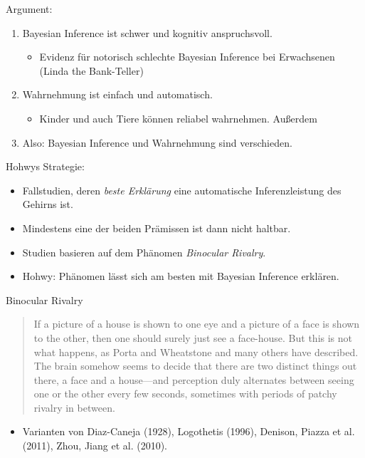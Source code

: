 \documentclass[11pt, handout]{beamer}
\begin{document}
\begin{frame}
  Argument:

  \begin{enumerate}[<+->]
  \item Bayesian Inference ist schwer und kognitiv anspruchsvoll.
    \begin{itemize}[<+->]
    \item Evidenz für notorisch schlechte Bayesian Inference bei
      Erwachsenen (Linda the Bank-Teller)
    \end{itemize}
  \item Wahrnehmung ist einfach und automatisch.
    \begin{itemize}[<+->]
    \item Kinder und auch Tiere können reliabel wahrnehmen. Außerdem
    
    \end{itemize}
  \item Also: Bayesian Inference und Wahrnehmung sind verschieden.
  \end{enumerate}

\end{frame}

\begin{frame}
  Hohwys Strategie:
  \begin{itemize}[<+->]
  \item Fallstudien, deren \emph{beste Erklärung} eine automatische
    Inferenzleistung des Gehirns ist.
  \item Mindestens eine der beiden Prämissen ist dann nicht haltbar.
  \item Studien basieren auf dem Phänomen \emph{Binocular Rivalry}.
  \item Hohwy: Phänomen lässt sich am besten mit Bayesian Inference
    erklären.
  \end{itemize}
\end{frame}

\begin{frame}
  Binocular Rivalry
  \begin{quote}
    If a picture of a house is shown to one eye and a picture of a
    face is shown to the other, then one should surely just see a
    face-house. But this is not what happens, as Porta and Wheatstone
    and many others have described. The brain somehow seems to decide
    that there are two distinct things out there, a face and a
    house—and perception duly alternates between seeing one or the
    other every few seconds, sometimes with periods of patchy rivalry
    in between.
  \end{quote}
  \begin{itemize}[<+->]
  \item Varianten von Diaz-Caneja (1928), Logothetis (1996), Denison,
    Piazza et al. (2011), Zhou, Jiang et al. (2010).
  \end{itemize}
   
\end{frame}
\end{document}
